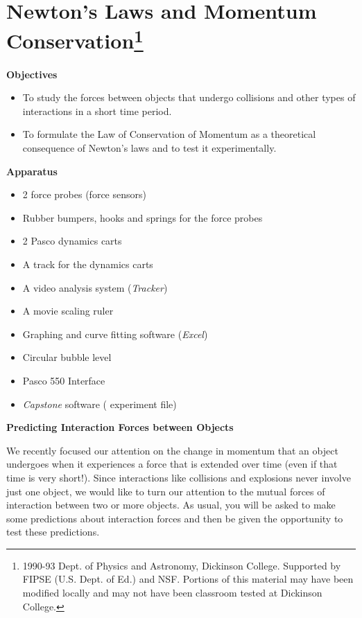 
\section{Newton's Laws and Momentum Conservation\footnote{
1990-93 Dept. of Physics and Astronomy, Dickinson College. Supported by FIPSE
(U.S. Dept. of Ed.) and NSF. Portions of this material may have been modified
locally and may not have been classroom tested at Dickinson College.
}}

\makelabheader %

\textbf{Objectives }

\begin{itemize}
\item To study the forces between objects that undergo collisions and other types
of interactions in a short time period. 
\item To formulate the Law of Conservation of Momentum as a theoretical consequence
of Newton's laws and to test it experimentally.
\end{itemize}
\textbf{Apparatus}

\begin{itemize}
\item 2 force probes (force sensors)
\item Rubber bumpers, hooks and springs for the force probes
\item 2 Pasco dynamics carts
\item A track for the dynamics carts
\item A video analysis system (\textit{Tracker})
\item A movie scaling ruler
\item Graphing and curve fitting software (\textit{Excel})
\item Circular bubble level
\item Pasco 550 Interface
\item \textit{Capstone} software ( experiment file)
\end{itemize}
\textbf{Predicting Interaction Forces between Objects} 

We recently focused our attention on the change in momentum that an object undergoes
when it experiences a force that is extended over time (even if that time is
very short!). Since interactions like collisions and explosions never involve
just one object, we would like to turn our attention to the mutual forces of
interaction between two or more objects. As usual, you will be asked to make
some predictions about interaction forces and then be given the opportunity
to test these predictions. 

